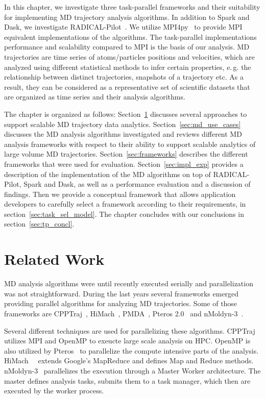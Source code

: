 In this chapter, we investigate three task-parallel frameworks and their suitability for implementing MD trajectory analysis algorithms.
In addition to Spark and Dask, we investigate RADICAL-Pilot~\cite{merzky2019using}.
We utilize MPI4py~\cite{dalcin2005mpi} to provide MPI equivalent implementations of the algorithms.
The task-parallel implementations performance and scalability compared to MPI is the basis of our analysis. 
MD trajectories are time series of atoms/particles positions and velocities, which are analyzed using different statistical methods to infer certain properties, e.\,g. the relationship between distinct trajectories, snapshots of a trajectory etc.
As a result, they can be considered as a representative set of scientific datasets that are organized as time series and their analysis algorithms. 

The chapter is organized as follows: Section~\ref{sec:tp_related_work} discusses several approaches to support scalable MD trajectory data analytics. Section~\ref{sec:md_use_cases} discusses the MD analysis algorithms investigated and reviews different MD analysis frameworks with respect to their ability to support scalable analytics of large volume MD trajectories. 
Section~\ref{sec:frameworks} describes the different frameworks that were used for evaluation. 
Section~\ref{sec:impl_exp} provides a description of the implementation of the MD algorithms on top of RADICAL-Pilot, Spark and  Dask, as well as a performance evaluation and a discussion of findings. 
Then we provide a conceptual framework that allows application developers to carefully select a framework according to their requirements, in  section~\ref{sec:task_sel_model}.
The chapter concludes with our conclusions in section~\ref{sec:tp_concl}.
%

\section{Related Work}
\label{sec:tp_related_work}
MD analysis algorithms were until recently executed serially and parallelization was not straightforward.
During the last years several frameworks emerged providing parallel algorithms for analyzing MD trajectories.
Some of those frameworks are CPPTraj~\cite{roe2013ptraj,roe2018parallelization}, HiMach~\cite{tiankai2008scalable}, PMDA~\cite{fan2019pmda}, Pteros 2.0~\cite{yesylevskyy2015pteros} and nMoldyn-3~\cite{hinsen2012nmoldyn}.

Several different techniques are used for parallelizing these algorithms.
CPPTraj~\cite{roe2018parallelization} utilizes MPI and OpenMP to exeucte large scale analysis on HPC.
OpenMP is also utilized by Pteros~\cite{yesylevskyy2015pteros} to parallelize the compute intensive parts of the analysis.
HiMach~~\cite{tiankai2008scalable} extends Google's MapReduce and defines Map and Reduce methods.
nMoldyn-3~\cite{hinsen2012nmoldyn} parallelizes the execution through a Master Worker architecture.
The master defines analysis tasks, submits them to a task manager, which then are executed by the worker process.

